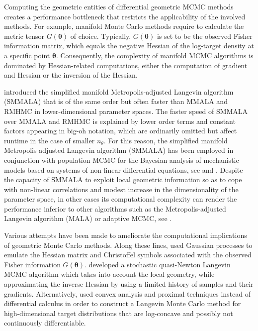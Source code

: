 \documentclass[twoside,11pt]{article}
\begin{document}
Computing the geometric entities of differential geometric MCMC methods creates a performance bottleneck that restricts the 
applicability of the involved methods. For example, manifold Monte Carlo methods require to calculate the metric tensor
$G(\boldsymbol{\theta})$ of choice. Typically, $G(\boldsymbol{\theta})$ is set to be the observed Fisher information matrix,
which equals the negative Hessian of the log-target density at a specific point $\boldsymbol{\theta}$. Consequently, the 
complexity of manifold MCMC algorithms is dominated by Hessian-related computations, either the computation of gradient and 
Hessian or the inversion of the Hessian.  

\cite{gir_cal__rie} introduced the simplified manifold Metropolis-adjusted Langevin algorithm (SMMALA) that is of the same 
order but often faster than MMALA and RMHMC in lower-dimensional parameter spaces. The faster speed of SMMALA over MMALA and 
RMHMC is explained by lower order terms and constant factors appearing in big-oh notation, which are ordinarily omitted but 
affect runtime in the case of smaller $n_\theta$. For this reason, the simplified manifold Metropolis adjusted Langevin 
algorithm (SMMALA) has been employed in conjunction with population MCMC for the Bayesian analysis of mechanistic models 
based on systems of non-linear differential equations, see \cite{cal_gir__sta} and \cite{sch_pap__ews}. Despite the capacity 
of SMMALA to exploit local geometric information so as to cope with non-linear correlations and modest increase in the 
dimensionality of the parameter space, in other cases its computational complexity can render the performance inferior to 
other algorithms such as the Metropolis-adjusted Langevin algorithm (MALA) or adaptive MCMC, see \cite{cal_eps_sil__bay}.

Various attempts have been made to ameliorate the computational implications of geometric Monte Carlo methods. Along these 
lines, \cite{lan_tha_chr__emu} used Gaussian processes to emulate the Hessian matrix and Christoffel symbols associated with 
the observed Fisher information $G(\boldsymbol{\theta})$. \cite{sim_bad_cem__sto} developed a stochastic quasi-Newton 
Langevin MCMC algorithm which takes into account the local geometry, while approximating the inverse Hessian by using a 
limited history of samples and their gradients. Alternatively, \cite{per__prox} used convex analysis and proximal techniques 
instead of differential calculus in order to construct a Langevin Monte Carlo method for high-dimensional target 
distributions that are log-concave and possibly not continuously differentiable.
\end{document}
